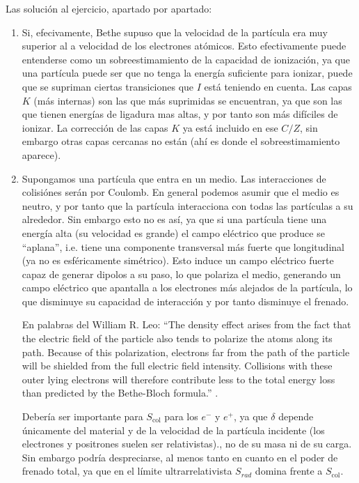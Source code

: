 Las solución al ejercicio, apartado por apartado: 
\begin{enumerate}[label=\alph*)]
    \item Si, efecivamente, Bethe supuso que la velocidad de la partícula era muy superior al a velocidad de los electrones atómicos. Esto efectivamente puede entenderse como un sobreestimamiento de la capacidad de ionización, ya que una partícula puede ser que no tenga la energía suficiente para ionizar, puede que se supriman ciertas transiciones que $I$ está teniendo en cuenta. Las capas $K$ (más internas) son las que más suprimidas se encuentran, ya que son las que tienen energías de ligadura mas altas, y por tanto son más difíciles de ionizar. La corrección de las capas $K$ ya está incluido en ese $C/Z$, sin embargo otras capas cercanas no están (ahí es donde el sobreestimamiento aparece).
    

    \item Supongamos una partícula que entra en un medio. Las interacciones de colisiónes serán por Coulomb. En general podemos asumir que el medio es neutro, y por tanto que la partícula interacciona con todas las partículas a su alrededor. Sin embargo esto no es así, ya que si una partícula tiene una energía alta (su velocidad es grande) el campo eléctrico que produce se ``aplana'', i.e. tiene una componente transversal más fuerte que longitudinal (ya no es esféricamente simétrico). Esto induce un campo eléctrico fuerte capaz de generar dipolos a su paso, lo que polariza el medio, generando un campo eléctrico que apantalla a los electrones más alejados de la partícula, lo que disminuye su capacidad de interacción y por tanto disminuye el frenado. 
    
    En palabras del William R. Leo: ``The density effect arises from the fact that the electric field of the particle also tends  to polarize the atoms along its path. Because of this polarization, electrons far from the  path of the particle will be shielded from the full electric field intensity. Collisions with  these outer lying electrons will therefore contribute less to the total energy loss than  predicted by the Bethe-Bloch formula.'' \cite{Leo1994}.

    Debería ser importante para $S_{\text{col}}$ para los $e^-$ y $e^+$, ya que $\delta$ depende únicamente del material y de la velocidad de la partícula incidente (los electrones y positrones suelen ser relativistas)., no de su masa ni de su carga. Sin embargo podría despreciarse, al menos tanto en cuanto en el poder de frenado total, ya que en el límite ultrarrelativista $S_{rad}$ domina frente a $S_{\text{col}}$.


\end{enumerate}
